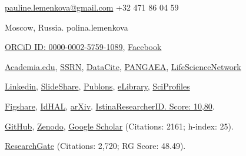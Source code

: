 \documentclass[10pt]{article}
\newenvironment{innerlist}[1][\enskip\textbullet]%
        {\begin{compactitem}[#1]}{\end{compactitem}}
\providecommand*\email[1]{\href{mailto:#1}{#1}}
\begin{document}
\begin{innerlist}
	\item[\Letter] \email{pauline.lemenkova@gmail.com} \phone +32 471 86 04 59
	\item[\faHome] Moscow, Russia. \faSkype \space polina.lemenkova
	\item[\textcolor{orcidlogocol}{\aiOrcid}] \href{https://orcid.org/0000-0002-5759-1089}{ORCiD ID: 0000-0002-5759-1089},  \faFacebookSquare \space\href{https://www.facebook.com/polina.lemenkova.7}{Facebook}%
	\item[\aiAcademia] \href{https://ulb.academia.edu/PolinaLemenkova}{Academia.edu}, \href{https://ssrn.com/author=3266317}{SSRN}, \href{https://search.datacite.org/people/0000-0002-5759-1089}{DataCite}, \href{https://doi.pangaea.de/10.1594/PANGAEA.680792}{PANGAEA}, \href{https://www.lifescience.net/profile/polina-lemenkova-9skfemem/}{LifeScienceNetwork}
	\item[\faLinkedin] \href{https://www.linkedin.com/in/paulinelemenkova}{Linkedin}, \faSlideshare\space \href{https://www.slideshare.net/PolinaLemenkova/presentations}{SlideShare}, \aiPublons \space \href{https://publons.com/researcher/1587436/polina-lemenkova/}{Publons}, \href{https://elibrary.ru/author_items.asp?authorid=153168}{eLibrary}, \href{https://sciprofiles.com/profile/535013}{SciProfiles}
	\item[\aiFigshare] \href{https://figshare.com/authors/Polina_Lemenkova/5855411}{Figshare}, \href{https://cv.archives-ouvertes.fr/polina-lemenkova}{IdHAL},  \aiarXiv \space\href{https://arxiv.org/a/lemenkova_p_1.html}{arXiv}. \href{http://istina.msu.ru/profile/polinalemenkova/}{IstinaResearcherID. Score: 10,80}. 
	\item[\faGithub] \href{https://github.com/paulinelemenkova}{GitHub}, \href{https://zenodo.org/search?page=1&size=20&q=lemenkova}{Zenodo}, \aiGoogleScholar\space \href{https://scholar.google.com/citations?user=As7apVQAAAAJ&hl=en}{Google Scholar} (Citations: 2161; h-index: 25). 
	\item[\aiResearchGate] \href{https://www.researchgate.net/profile/Polina-Lemenkova-2}{ResearchGate} (Citations: 2,720; RG Score: 48.49).

\end{innerlist}
\end{document}
